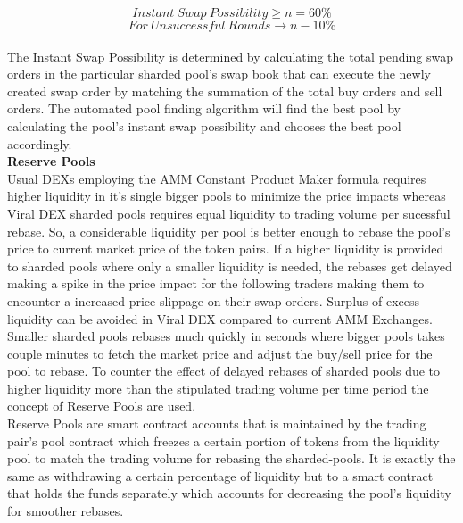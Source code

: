 \documentclass[10pt]{article}
\begin{document}
\begin{equation}
Instant\:Swap\:Possibility \geq n = 60\%
\end{equation}
\begin{equation}
For\:Unsuccessful\:Rounds \rightarrow n-10\%
\end{equation}\\
The Instant Swap Possibility is determined by calculating the total pending swap orders in the particular sharded pool's swap book that can execute the newly created swap order by matching the summation of the total buy orders and sell orders. The automated pool finding algorithm will find the best pool by calculating the pool's instant swap possibility and chooses the best pool accordingly.\\

\textbf{Reserve Pools}\\

Usual DEXs employing the AMM Constant Product Maker formula requires higher liquidity in it's single bigger pools to minimize the price impacts whereas Viral DEX sharded pools requires equal liquidity to trading volume per sucessful rebase. So, a considerable liquidity per pool is better enough to rebase the pool's price to current market price of the token pairs. If a higher liquidity is provided to sharded pools where only a smaller liquidity is needed, the rebases get delayed making a spike in the price impact for the following traders making them to encounter a increased price slippage on their swap orders. Surplus of excess liquidity can be avoided in Viral DEX compared to current AMM Exchanges. Smaller sharded pools rebases much quickly in seconds where bigger pools takes couple minutes to fetch the market price and adjust the buy/sell price for the pool to rebase. To counter the effect of delayed rebases of sharded pools due to higher liquidity more than the stipulated trading volume per time period the concept of Reserve Pools are used.\\

Reserve Pools are smart contract accounts that is maintained by the trading pair's pool contract which freezes a certain portion of tokens from the liquidity pool to match the trading volume for rebasing the sharded-pools. It is exactly the same as withdrawing a certain percentage of liquidity but to a smart contract that holds the funds separately which accounts for decreasing the pool's liquidity for smoother rebases.\\
\end{document}
